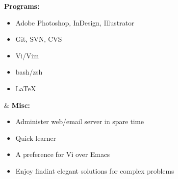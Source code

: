 \documentclass[]{res}
\begin{document}
\begin{resume}
\begin{ncolumn}{2}
  {\bf Programs:}
  \begin{itemize}
  \item Adobe Photoshop, InDesign, Illustrator
  \item Git, SVN, CVS
  \item Vi/Vim
  \item bash/zsh
  \item \LaTeX
  \end{itemize}
&
  {\bf Misc:}
  \begin{itemize}
  \item Administer web/email server in spare time
  \item Quick learner
  \item A preference for Vi over Emacs
  \item Enjoy findint elegant solutions for complex problems
  \end{itemize}
\end{ncolumn}


\end{resume}
\end{document}
